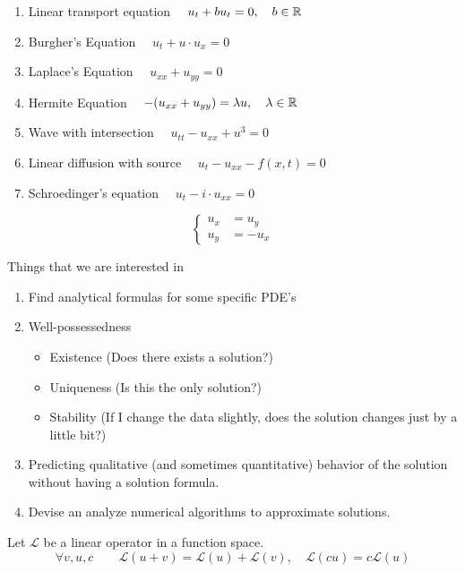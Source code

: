 \begin{example}
	\begin{enumerate}
		\item Linear transport equation $ \quad u_t + bu_t = 0, \quad b \in \mathbb R$

		\item Burgher's Equation 
		$\quad u_t + u \cdot u_x = 0$
		\item Laplace's Equation
		$\quad u_{xx} + u_{yy} = 0$
		\item Hermite Equation
		$\quad -(u_{xx} + u_{yy}) = \lambda u, \quad \lambda \in \mathbb R$
		\item Wave with intersection 
		$\quad u_{tt} - u_{xx} + u^3 = 0$
		\item Linear diffusion with source
		$\quad u_t - u_{xx} - f(x,t) = 0$
		\item Schroedinger's equation 
		$\quad u_t - i \cdot u_{xx} = 0$
	\end{enumerate}
\end{example}
\begin{example}
	\[ \left\{ \begin{array}{cc}
		u_x &= u_y \\
		u_y &= -u_x
	\end{array} \right.\]
\end{example}
\begin{remark}
	Things that we are interested in
	\begin{enumerate}
		\item Find analytical formulas for some specific PDE's
		\item Well-possessedness
		\begin{itemize}
			\item Existence (Does there exists a solution?)
			\item Uniqueness (Is this the only solution?)
			\item Stability (If I change the data slightly, does the solution changes just by a little bit?)
		\end{itemize}
		\item Predicting qualitative (and sometimes quantitative) behavior of the solution without having a solution formula. 
		\item Devise an analyze numerical algorithms to approximate solutions.
	\end{enumerate}
\end{remark}
\begin{remark}
	Let $\mathscr L$ be a linear operator in a function space.
	\[ \forall v,u,c \qquad \mathscr L(u + v) = \mathscr L (u) + \mathscr L(v), \quad \mathscr L(cu) = c\mathscr L(u)\]
\end{remark}
